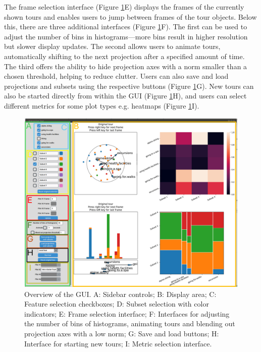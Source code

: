 \documentclass[article]{ajs}
\begin{document}
The frame selection interface (Figure \ref{fig:GUI_overview}E) displays the frames of the currently shown tours and enables users to jump between frames of the tour objects. Below this, there are three additional interfaces (Figure \ref{fig:GUI_overview}F). The first can be used to adjust the number of bins in histograms—more bins result in higher resolution but slower display updates. The second allows users to animate tours, automatically shifting to the next projection after a specified amount of time. The third offers the ability to hide projection axes with a norm smaller than a chosen threshold, helping to reduce clutter. Users can also save and load projections and subsets using the respective buttons (Figure \ref{fig:GUI_overview}G). New tours can also be started directly from within the GUI (Figure \ref{fig:GUI_overview}H), and users can select different metrics for some plot types e.g. heatmaps (Figure \ref{fig:GUI_overview}I).

\begin{figure}[h!]
    \centering
    \includegraphics[width=1\textwidth]{GUI_overview.png}
    \caption{Overview of the GUI. A: Sidebar controls; B: Display area; C: Feature selection checkboxes; D: Subset selection with color indicators; E: Frame selection interface; F: Interfaces for adjusting the number of bins of histograms, animating tours and blending out projection axes with a low norm; G: Save and load buttons; H: Interface for starting new tours; I: Metric selection interface.}
    \label{fig:GUI_overview}
\end{figure}
\end{document}
